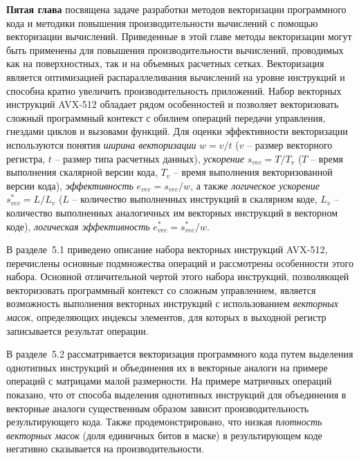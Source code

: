 \documentclass[a4paper,14pt]{extarticle}                     %
\theoremstyle{plain}                                         %
\begin{document}
\textbf{Пятая глава} посвящена задаче разработки методов векторизации программного кода и методики повышения производительности вычислений с помощью векторизации вычислений.
Приведенные в этой главе методы векторизации могут быть применены для повышения производительности вычислений, проводимых как на поверхностных, так и на объемных расчетных сетках.
Векторизация является оптимизацией распараллеливания вычислений на уровне инструкций и способна кратно увеличить производительность приложений.
Набор векторных инструкций AVX-512 обладает рядом особенностей и позволяет векторизовать сложный программный контекст с обилием операций передачи управления, гнездами циклов и вызовами функций.
Для оценки эффективности векторизации используются понятия \textit{ширина векторизации} $w = v/t$ ($v$ -- размер векторного регистра, $t$ -- размер типа расчетных данных), \textit{ускорение} $s_{vec} = T/T_v$ ($T$ -- время выполнения скалярной версии кода, $T_v$ -- время выполнения векторизованной версии кода), \textit{эффективность} $e_{vec} = s_{vec}/w$, а также \textit{логическое ускорение} $s_{vec}^{*} = L/L_v$ ($L$ -- количество выполненных инструкций в скалярном коде, $L_v$ -- количество выполненных аналогичных им векторных инструкций в векторном коде), \textit{логическая эффективность} $e_{vec}^{*} = s_{vec}^{*}/w$.


В разделе~5.1 приведено описание набора векторных инструкций AVX-512, перечислены основные подмножества операций и рассмотрены особенности этого набора.
Основной отличительной чертой этого набора инструкций, позволяющей векторизовать программный контекст со сложным управлением, является возможность выполнения векторных инструкций с использованием \textit{векторных масок}, определяющих индексы элементов, для которых в выходной регистр записывается результат операции.


В разделе~5.2 рассматривается векторизация программного кода путем выделения однотипных инструкций и объединения их в векторные аналоги на примере операций с матрицами малой размерности.
На примере матричных операций показано, что от способа выделения однотипных инструкций для объединения в векторные аналоги существенным образом зависит производительность результирующего кода.
Также продемонстрировано, что низкая \textit{плотность векторных масок} (доля единичных битов в маске) в результирующем коде негативно сказывается на производительности.
\end{document}
